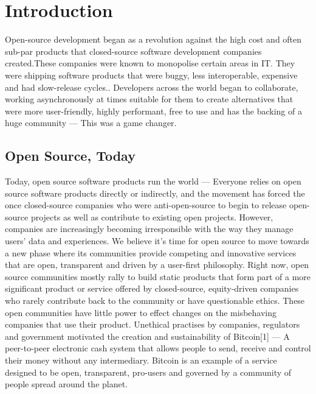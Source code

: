 \newpage
\section{Introduction} 
Open-source development began as a revolution against the high cost and often sub-par products that closed-source software development companies created.These companies were known to monopolise certain areas in IT. They were shipping software products that were buggy, less interoperable, expensive and had slow-release cycles.. Developers across the world began to collaborate, working asynchronously at times suitable for them to create alternatives that were more user-friendly, highly performant, free to use and has the backing of a huge community — This was a game changer.


\subsection{Open Source, Today}
Today, open source software products run the world — Everyone relies on open source software products directly or indirectly, and the movement has forced the once closed-source companies who were anti-open-source to begin to release open-source projects as well as contribute to existing open projects. However, companies are increasingly becoming irresponsible with the way they manage users’ data and experiences. We believe it’s time for open source to move towards a new phase where its communities provide competing and innovative services that are open, transparent and driven by a user-first philosophy. Right now, open source communities mostly rally to build static products that form part of a more significant product or service offered by closed-source, equity-driven companies who rarely contribute back to the community or have questionable ethics. These open communities have little power to effect changes on the misbehaving companies that use their product. Unethical practises by companies, regulators and government motivated the creation and sustainability of Bitcoin[1] — A peer-to-peer electronic cash system that allows people to send, receive and control their money without any intermediary. Bitcoin is an example of a service designed to be open, transparent, pro-users and governed by a community of people spread around the planet.

